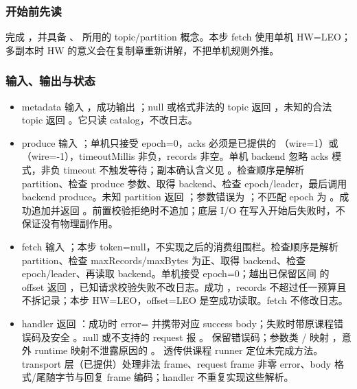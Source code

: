 \subsubsection*{开始前先读}
完成 ，并具备 、 所用的 topic/partition 概念。本步 fetch 使用单机 HW=LEO；多副本时 HW 的意义会在复制章重新讲解，不把单机规则外推。
\subsubsection*{输入、输出与状态}
\begin{itemize}
\item metadata 输入 ，成功输出 ；null 或格式非法的 topic 返回 ，未知的合法 topic 返回 。它只读 catalog，不改日志。
\item produce 输入 ；单机只接受 epoch=0，acks 必须是已提供的 （wire=1）或 （wire=-1），timeoutMillis 非负，records 非空。单机 backend 忽略 acks 模式，非负 timeout 不触发等待；副本确认含义见 。检查顺序是解析 partition、检查 produce 参数、取得 backend、检查 epoch/leader，最后调用 backend produce。未知 partition 返回 ；参数错误为 ；不匹配 epoch 为 。成功追加并返回 。前置校验拒绝时不追加；底层 I/O 在写入开始后失败时，不保证没有物理副作用。
\item fetch 输入 ；本步 token=null，不实现之后的消费组围栏。检查顺序是解析 partition、检查 maxRecords/maxBytes 为正、取得 backend、检查 epoch/leader、再读取 backend。单机接受 epoch=0；越出已保留区间  的 offset 返回 ，已知请求校验失败不改日志。成功 ，records 不超过任一预算且不拆记录；本步 HW=LEO，offset=LEO 是空成功读取。fetch 不修改日志。
\item handler 返回 ：成功时 error= 并携带对应 success body；失败时带原课程错误码及安全 。null 或不支持的 request 报 。 保留错误码；参数类 / 映射 ，意外 runtime 映射不泄露原因的 。 透传供课程 runner 定位未完成方法。transport 层（已提供）处理非法 frame、request frame 非零 error、body 格式/尾随字节与回复 frame 编码；handler 不重复实现这些解析。
\end{itemize}
